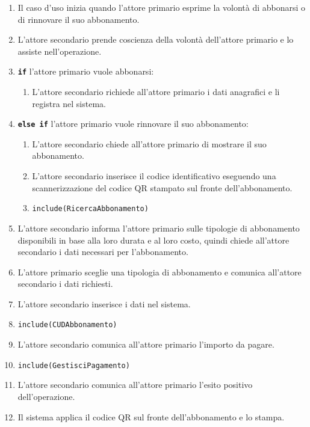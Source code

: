 \documentclass{article}
\begin{document}
	\begin{enumerate}[itemsep=8pt,parsep=0pt]

		\item Il caso d'uso inizia quando l'attore primario esprime la volontà di abbonarsi o di rinnovare il suo abbonamento.
		\item L'attore secondario prende coscienza della volontà dell'attore primario e lo assiste nell'operazione.
		\item \texttt{\textbf{if}} l'attore primario vuole abbonarsi:
			\begin{enumerate}	[leftmargin=28pt]
				\item L'attore secondario richiede all'attore primario i dati anagrafici e li registra nel sistema.
			\end{enumerate}
		\item \texttt{\textbf{else if}} l'attore primario vuole rinnovare il suo abbonamento:
			\begin{enumerate}	[leftmargin=28pt]
				\item L'attore secondario chiede all'attore primario di mostrare il suo abbonamento.
				\item L'attore secondario inserisce il codice identificativo eseguendo una scannerizzazione del codice QR stampato sul fronte dell'abbonamento.
				\item \texttt{include(RicercaAbbonamento)}
			\end{enumerate}
		\item L'attore secondario informa l'attore primario sulle tipologie di abbonamento disponibili in base alla loro durata e al loro costo, quindi chiede all'attore secondario i dati necessari per l'abbonamento.
		\item L'attore primario sceglie una tipologia di abbonamento e comunica all'attore secondario i dati richiesti. 
		\item L'attore secondario inserisce i dati nel sistema.
		\item  \texttt{include(CUDAbbonamento)}
		\item L'attore secondario comunica all'attore primario l'importo da pagare.
		\item  \texttt{include(GestisciPagamento)}
		\item L'attore secondario comunica all'attore primario l'esito positivo dell'operazione.
		\item Il sistema applica il codice QR sul fronte dell'abbonamento e lo stampa.
		
	\end{enumerate}
	
\end{document}
